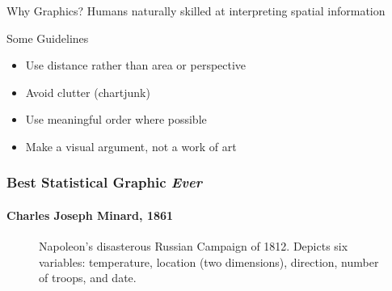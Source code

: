 \documentclass[handout]{beamer}
\begin{document}
\begin{frame}
\begin{columns}
	\vspace{5em}
\end{columns}

\end{frame}

\begin{frame}

	\begin{block}{Why Graphics?}
	Humans naturally skilled at interpreting spatial information
	\end{block}


\begin{block}{Some Guidelines}
	\begin{itemize}
		\item Use \alert{distance} rather than area or perspective
		\item Avoid clutter (chartjunk)
		\item Use meaningful order where possible
		\item Make a \alert{visual argument}, not a work of art
	\end{itemize}
\end{block}

\end{frame}

\begin{frame}
\singlespacing
\frametitle{Best Statistical Graphic \emph{Ever}}
\framesubtitle{Charles Joseph Minard, 1861 }
\begin{figure}
\caption{Napoleon's disasterous Russian Campaign of 1812. Depicts six variables: temperature, location (two dimensions), direction, number of troops, and date.}
\end{figure}

\end{frame}
\end{document}
